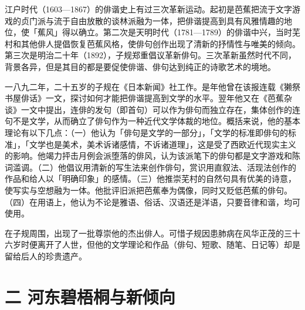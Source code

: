 {\FS
    江户时代（1603—1867）的俳谐史上有过三次革新运动。起初是芭蕉把流于文字游戏的贞门派与流于自由放散的谈林派融为一体，把俳谐提高到具有风雅情趣的地位，使「蕉风」得以确立。第二次是天明时代（1781—1789）的俳谐中兴，当时芜村和其他俳人提倡恢复芭蕉风格，使俳句创作出现了清新的抒情性与唯美的倾向。第三次是明治二十年（1892），子规郑重倡议革新俳句。三次革新虽然时代不同，背景各异，但是其目的都是要促使俳谐、俳句达到纯正的诗歌艺术的境地。

    一八九二年，二十五岁的子规在《日本新闻》社工作。是年他曾在该报连载《獭祭书屋俳话》一文，探讨如何才能把俳谐提高到文学的水平。翌年他又在《芭蕉杂谈》一文中提出，连俳的发句（即首句）可以作为俳句而独立存在，集体创作的连句不是文学，从而确立了俳句作为一种近代文学体裁的地位。概括来说，他的基本理论有以下几点：（一）他认为「俳句是文学的一部分」，「文学的标准即俳句的标准」，「文学也是美术，美术诉诸感情，不诉诸道理」，这是受了西欧近代现实主义的影响。他竭力抨击月例会派堕落的俳风，认为该派笔下的俳句都是文字游戏和陈词滥调。（二）他倡议用清新的写生法来创作俳句，赏识用直叙法、活现法创作的作品和给人以「明确印象」的感情。（三）他推崇芜村的自然句具有优美的诗意，使写实与空想融为一体。他批评旧派把芭蕉奉为偶像，同时又贬低芭蕉的俳句。（四）在用语上，他认为不论是雅语、俗话、汉语还是洋语，只要音律和谐，均可使用。

    在子规周围，出现了一批尊崇他的杰出俳人。可惜子规因患肺病在风华正茂的三十六岁时便离开了人世，但他的文学理论和作品（俳句、短歌、随笔、日记等）却是留给后人的珍贵遗产。
}

\section*{\FS 二 河东碧梧桐与新倾向}

